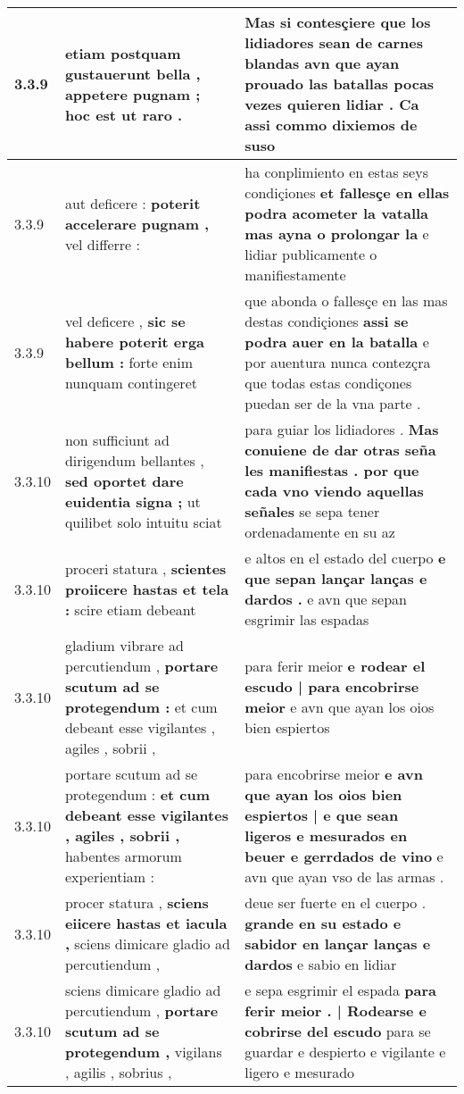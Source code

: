 \begin{tabular}{|p{1cm}|p{6.5cm}|p{6.5cm}|}
3.3.9 & etiam postquam gustauerunt bella , \textbf{ appetere pugnam ; } hoc est ut raro . & Mas si contesçiere que los lidiadores sean de carnes blandas \textbf{ avn que ayan prouado las batallas pocas vezes quieren lidiar . } Ca assi commo dixiemos de suso \\\hline
3.3.9 & aut deficere : \textbf{ poterit accelerare pugnam , } vel differre : & ha conplimiento en estas seys condiçiones \textbf{ et fallesçe en ellas podra acometer la vatalla mas ayna o prolongar la } e lidiar publicamente o manifiestamente \\\hline
3.3.9 & vel deficere , \textbf{ sic se habere poterit erga bellum : } forte enim nunquam contingeret & que abonda o fallesçe en las mas destas condiçiones \textbf{ assi se podra auer en la batalla } e por auentura nunca contezçra que todas estas condiçones puedan ser de la vna parte . \\\hline
3.3.10 & non sufficiunt ad dirigendum bellantes , \textbf{ sed oportet dare euidentia signa ; } ut quilibet solo intuitu sciat & para guiar los lidiadores . \textbf{ Mas conuiene de dar otras seña les manifiestas . por que cada vno viendo aquellas señales } se sepa tener ordenadamente en su az \\\hline
3.3.10 & proceri statura , \textbf{ scientes proiicere hastas et tela : } scire etiam debeant & e altos en el estado del cuerpo \textbf{ e que sepan lançar lanças e dardos . } e avn que sepan esgrimir las espadas \\\hline
3.3.10 & gladium vibrare ad percutiendum , \textbf{ portare scutum ad se protegendum : } et cum debeant esse vigilantes , agiles , sobrii , & para ferir meior \textbf{ e rodear el escudo | para encobrirse meior } e avn que ayan los oios bien espiertos \\\hline
3.3.10 & portare scutum ad se protegendum : \textbf{ et cum debeant esse vigilantes , agiles , sobrii , } habentes armorum experientiam : & para encobrirse meior \textbf{ e avn que ayan los oios bien espiertos | e que sean ligeros e mesurados en beuer e gerrdados de vino } e avn que ayan vso de las armas . \\\hline
3.3.10 & procer statura , \textbf{ sciens eiicere hastas et iacula , } sciens dimicare gladio ad percutiendum , & deue ser fuerte en el cuerpo . \textbf{ grande en su estado e sabidor en lançar lanças e dardos } e sabio en lidiar \\\hline
3.3.10 & sciens dimicare gladio ad percutiendum , \textbf{ portare scutum ad se protegendum , } vigilans , agilis , sobrius , & e sepa esgrimir el espada \textbf{ para ferir meior . | Rodearse e cobrirse del escudo } para se guardar e despierto e vigilante e ligero e mesurado \\\hline

\end{tabular}
